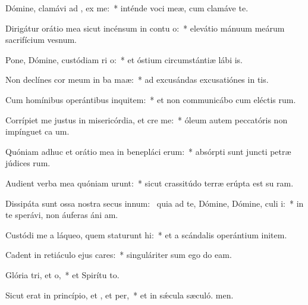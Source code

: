 \item Dómine, clamávi ad , ex me:~* inténde voci meæ, cum clamáve  te.
\item Dirigátur orátio mea sicut incénsum in contu o:~* elevátio mánuum meárum sacrifícium vesnum.
\item Pone, Dómine, custódiam ri o:~* et óstium circumstántiæ lábi is.
\item Non declínes cor meum in ba maæ:~* ad excusándas excusatiónes in tis.
\item Cum homínibus operántibus inquitem:~* et non communicábo cum eléctis rum.
\item Corrípiet me justus in misericórdia, et cre me:~* óleum autem peccatóris non impínguet ca um.
\item Quóniam adhuc et orátio mea in benepláci erum:~* absórpti sunt juncti petræ júdices rum.
\item Audient verba mea quóniam urunt:~* sicut crassitúdo terræ erúpta est su ram.
\item Dissipáta sunt ossa nostra secus innum:~\pscross{} quia ad te, Dómine, Dómine, culi i:~* in te sperávi, non áuferas áni am.
\item Custódi me a láqueo, quem staturunt hi:~* et a scándalis operántium initem.
\item Cadent in retiáculo ejus cares:~* singuláriter sum ego do eam.
\item Glória tri, et o,~* et Spirítu to.
\item Sicut erat in princípio, et , et per,~* et in sǽcula sæculó. men.
